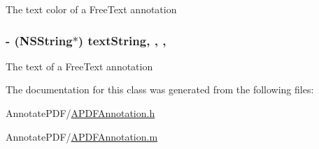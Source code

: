 The text color of a Free\-Text annotation \hypertarget{interface_a_p_d_f_annotation_ac7a9328cd7302940ddfbe3cbe79cb7ee}{
\subsubsection[{text\-String}]{\setlength{\rightskip}{0pt plus 5cm}-\/ (N\-S\-String$\ast$) text\-String\hspace{0.3cm}{\ttfamily [read]}, {\ttfamily [write]}, {\ttfamily [nonatomic]}, {\ttfamily [retain]}}}\label{interface_a_p_d_f_annotation_ac7a9328cd7302940ddfbe3cbe79cb7ee}
The text of a Free\-Text annotation 

The documentation for this class was generated from the following files\-:\begin{DoxyCompactItemize}
\item 
Annotate\-P\-D\-F/\hyperlink{_a_p_d_f_annotation_8h}{A\-P\-D\-F\-Annotation.\-h}\item 
Annotate\-P\-D\-F/\hyperlink{_a_p_d_f_annotation_8m}{A\-P\-D\-F\-Annotation.\-m}\end{DoxyCompactItemize}
